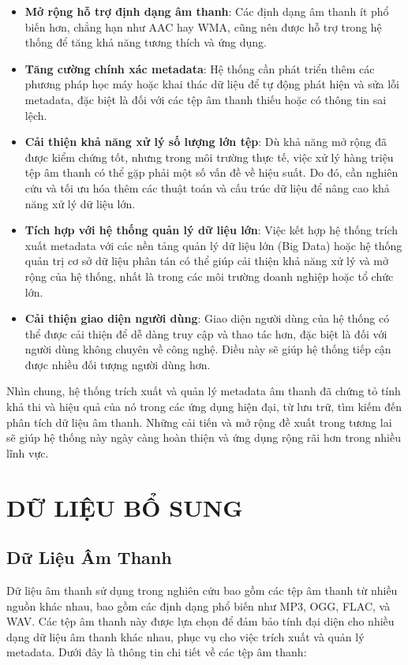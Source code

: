 \documentclass[conference]{IEEEtran}
\begin{document}
\begin{itemize}
    \item \textbf{Mở rộng hỗ trợ định dạng âm thanh}: Các định dạng âm thanh ít phổ biến hơn, chẳng hạn như AAC hay WMA, cũng nên được hỗ trợ trong hệ thống để tăng khả năng tương thích và ứng dụng.
    \item \textbf{Tăng cường chính xác metadata}: Hệ thống cần phát triển thêm các phương pháp học máy hoặc khai thác dữ liệu để tự động phát hiện và sửa lỗi metadata, đặc biệt là đối với các tệp âm thanh thiếu hoặc có thông tin sai lệch.
    \item \textbf{Cải thiện khả năng xử lý số lượng lớn tệp}: Dù khả năng mở rộng đã được kiểm chứng tốt, nhưng trong môi trường thực tế, việc xử lý hàng triệu tệp âm thanh có thể gặp phải một số vấn đề về hiệu suất. Do đó, cần nghiên cứu và tối ưu hóa thêm các thuật toán và cấu trúc dữ liệu để nâng cao khả năng xử lý dữ liệu lớn.
    \item \textbf{Tích hợp với hệ thống quản lý dữ liệu lớn}: Việc kết hợp hệ thống trích xuất metadata với các nền tảng quản lý dữ liệu lớn (Big Data) hoặc hệ thống quản trị cơ sở dữ liệu phân tán có thể giúp cải thiện khả năng xử lý và mở rộng của hệ thống, nhất là trong các môi trường doanh nghiệp hoặc tổ chức lớn.
    \item \textbf{Cải thiện giao diện người dùng}: Giao diện người dùng của hệ thống có thể được cải thiện để dễ dàng truy cập và thao tác hơn, đặc biệt là đối với người dùng không chuyên về công nghệ. Điều này sẽ giúp hệ thống tiếp cận được nhiều đối tượng người dùng hơn.
\end{itemize}

Nhìn chung, hệ thống trích xuất và quản lý metadata âm thanh đã chứng tỏ tính khả thi và hiệu quả của nó trong các ứng dụng hiện đại, từ lưu trữ, tìm kiếm đến phân tích dữ liệu âm thanh. Những cải tiến và mở rộng đề xuất trong tương lai sẽ giúp hệ thống này ngày càng hoàn thiện và ứng dụng rộng rãi hơn trong nhiều lĩnh vực.


\section{DỮ LIỆU BỔ SUNG}

\subsection{Dữ Liệu Âm Thanh}
Dữ liệu âm thanh sử dụng trong nghiên cứu bao gồm các tệp âm thanh từ nhiều nguồn khác nhau, bao gồm các định dạng phổ biến như MP3, OGG, FLAC, và WAV. Các tệp âm thanh này được lựa chọn để đảm bảo tính đại diện cho nhiều dạng dữ liệu âm thanh khác nhau, phục vụ cho việc trích xuất và quản lý metadata. Dưới đây là thông tin chi tiết về các tệp âm thanh:
\end{document}
